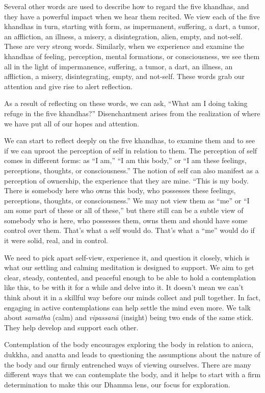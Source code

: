 Several other words are used to describe how to regard the five khandhas, and they have a powerful impact when we hear them recited. We view each of the five khandhas in turn, starting with form, as impermanent, suffering, a dart, a tumor, an affliction, an illness, a misery, a disintegration, alien, empty, and not-self. These are very strong words. Similarly, when we experience and examine the khandhas of feeling, perception, mental formations, or consciousness, we see them all in the light of impermanence, suffering, a tumor, a dart, an illness, an affliction, a misery, disintegrating, empty, and not-self. These words grab our attention and give rise to alert reflection.

As a result of reflecting on these words, we can ask, ``What am I doing taking refuge in the five khandhas?'' Disenchantment arises from the realization of where we have put all of our hopes and attention.

We can start to reflect deeply on the five khandhas, to examine them and to see if we can uproot the perception of self in relation to them. The perception of self comes in different forms: as ``I am,'' ``I am this body,'' or ``I am these feelings, perceptions, thoughts, or consciousness.'' The notion of self can also manifest as a perception of ownership, the experience that they are mine. ``This is my body. There is somebody here who owns this body, who possesses these feelings, perceptions, thoughts, or consciousness.'' We may not view them as ``me'' or ``I am some part of these or all of these,'' but there still can be a subtle view of somebody who is here, who possesses them, owns them and should have some control over them. That's what a self would do. That's what a ``me'' would do if it were solid, real, and in control.

We need to pick apart self-view, experience it, and question it closely, which is what our settling and calming meditation is designed to support. We aim to get clear, steady, contented, and peaceful enough to be able to hold a contemplation like this, to be with it for a while and delve into it. It doesn't mean we can't think about it in a skillful way before our minds collect and pull together. In fact, engaging in active contemplations can help settle the mind even more. We talk about \emph{samatha} (calm) and \emph{vipassanā} (insight) being two ends of the same stick. They help develop and support each other.

Contemplation of the body encourages exploring the body in relation to anicca, dukkha, and anatta and leads to questioning the assumptions about the nature of the body and our firmly entrenched ways of viewing ourselves. There are many different ways that we can contemplate the body, and it helps to start with a firm determination to make this our Dhamma lens, our focus for exploration.

